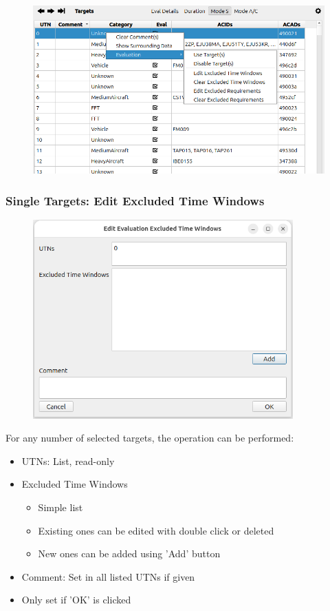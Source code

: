 \begin{figure}[H]
  \center
  \includegraphics[width=14cm,frame]{figures/eval_targets_context_menu.png}
\end{figure}

\subsubsection{Single Targets: Edit Excluded Time Windows}

\begin{figure}[H]
  \center
  \includegraphics[width=10cm,frame]{figures/eval_targets_excl_tw.png}
\end{figure}

For any number of selected targets, the operation can be performed:
\begin{itemize}
  \item UTNs: List, read-only
  \item Excluded Time Windows
  \begin{itemize}
  \item Simple list
  \item Existing ones can be edited with double click or deleted
  \item New ones can be added using 'Add' button
\end{itemize} 
  \item Comment: Set in all listed UTNs if given
  \item Only set if 'OK' is clicked
\end{itemize} 
\ \\

